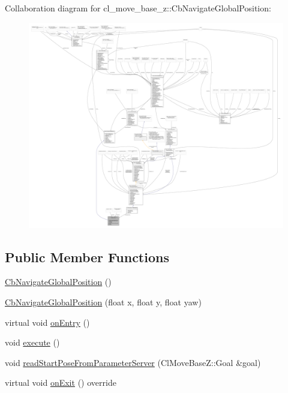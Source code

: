 Collaboration diagram for cl\+\_\+move\+\_\+base\+\_\+z\+:\+:Cb\+Navigate\+Global\+Position\+:
\nopagebreak
\begin{figure}[H]
\begin{center}
\leavevmode
\includegraphics[width=350pt]{classcl__move__base__z_1_1CbNavigateGlobalPosition__coll__graph}
\end{center}
\end{figure}
\subsection*{Public Member Functions}
\begin{DoxyCompactItemize}
\item 
\hyperlink{classcl__move__base__z_1_1CbNavigateGlobalPosition_aec75d2481b2057bbbdad9513c4dc08cd}{Cb\+Navigate\+Global\+Position} ()
\item 
\hyperlink{classcl__move__base__z_1_1CbNavigateGlobalPosition_a79d42c0eeee48af5e73d917fa2d5b4f5}{Cb\+Navigate\+Global\+Position} (float x, float y, float yaw)
\item 
virtual void \hyperlink{classcl__move__base__z_1_1CbNavigateGlobalPosition_a66d8b0555ef2945bc108dcd5171be292}{on\+Entry} ()
\item 
void \hyperlink{classcl__move__base__z_1_1CbNavigateGlobalPosition_a0b8525ea9e4388b27cb1f9b1e06a3b63}{execute} ()
\item 
void \hyperlink{classcl__move__base__z_1_1CbNavigateGlobalPosition_a868b25f238e3781c9a2e44b4e1502fcc}{read\+Start\+Pose\+From\+Parameter\+Server} (Cl\+Move\+Base\+Z\+::\+Goal \&goal)
\item 
virtual void \hyperlink{classcl__move__base__z_1_1CbNavigateGlobalPosition_a5c18268af1e7fc236aa155a58345d5d7}{on\+Exit} () override
\end{DoxyCompactItemize}
